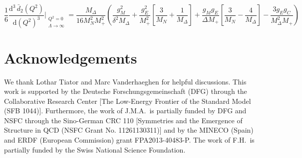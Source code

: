 \documentclass[twocolumn,prc,showpacs,nofootinbib,preprintnumbers,amsmath,amssymb,superscriptaddress]{revtex4-1}
\def\beq{\begin{equation}}
\def\eeq{\end{equation}}
\def\dd{\mathrm{d}}
\begin{document}
\begin{widetext}
\beq
\frac{1}{6}\frac{\dd^3\, \bar d_2(Q^2)}{\dd( Q^2)^3}\Bigg\vert_{\substack{Q^2=0\\ \Lambda \rightarrow \infty}}=\frac{M_\Delta}{16M_N^2M_+^2}\left(\frac{g_M^2}{ \delta ^2 M_\Delta}+\frac{g_E^2}{M_+^2}\left[\frac{3 }{ M_N}+\frac{1}{M_\Delta}\right]+\frac{g_M g_E}{\Delta M_+ }\left[\frac{3}{ M_N}-\frac{4}{M_\Delta}\right]-\frac{3 g_E g_C}{ M_\Delta^2 M_+}\right)
\eeq





\end{widetext}



\section*{Acknowledgements}

We thank Lothar Tiator and Marc Vanderhaeghen for helpful discussions. This work is supported by the Deutsche Forschungsgemeinschaft (DFG) through the
Collaborative Research Center [The Low-Energy Frontier of the Standard Model (SFB 1044)]. Furthermore, the work of 
J.M.A.\ is partially funded by DFG and NSFC through the Sino-German CRC 110 [Symmetries and the Emergence of Structure in QCD (NSFC Grant No. 11261130311)] and by the MINECO (Spain) and ERDF (European Commission) grant FPA2013-40483-P. The work of F.H.\ is partially funded by the Swiss National Science Foundation.
\end{document}
